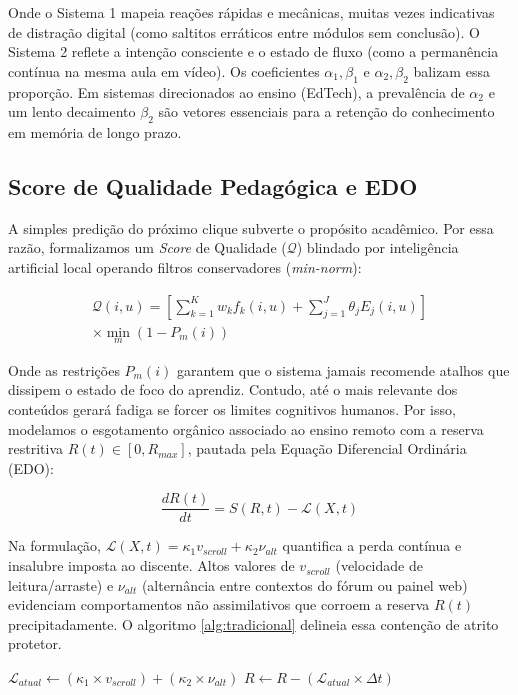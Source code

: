 \documentclass[english, spanish, brazilian]{RBIEarticle}
\begin{document}
Onde o Sistema 1 mapeia reações rápidas e mecânicas, muitas vezes indicativas de distração digital (como saltitos erráticos entre módulos sem conclusão). O Sistema 2 reflete a intenção consciente e o estado de fluxo (como a permanência contínua na mesma aula em vídeo). Os coeficientes $\alpha_1, \beta_1$ e $\alpha_2, \beta_2$ balizam essa proporção. Em sistemas direcionados ao ensino (EdTech), a prevalência de $\alpha_2$ e um lento decaimento $\beta_2$ são vetores essenciais para a retenção do conhecimento em memória de longo prazo.

\subsection{Score de Qualidade Pedagógica e EDO}

A simples predição do próximo clique subverte o propósito acadêmico. Por essa razão, formalizamos um \textit{Score} de Qualidade ($\mathcal{Q}$) blindado por inteligência artificial local operando filtros conservadores (\textit{min-norm}):

\begin{multline} \label{eq:score}
    \mathcal{Q}(i,u) = \left[ \sum_{k=1}^{K} w_k f_k(i,u) + \sum_{j=1}^{J} \theta_j E_j(i,u) \right] \\
    \times \min_{m} (1 - P_m(i))
\end{multline}

Onde as restrições $P_m(i)$ garantem que o sistema jamais recomende atalhos que dissipem o estado de foco do aprendiz. Contudo, até o mais relevante dos conteúdos gerará fadiga se forcer os limites cognitivos humanos. Por isso, modelamos o esgotamento orgânico associado ao ensino remoto com a reserva restritiva $R(t) \in [0, R_{max}]$, pautada pela Equação Diferencial Ordinária (EDO):

\begin{equation} \label{eq:edo}
    \frac{dR(t)}{dt} = S(R, t) - \mathcal{L}(X, t)
\end{equation}

Na formulação, $\mathcal{L}(X, t) = \kappa_1 v_{scroll} + \kappa_2 \nu_{alt}$ quantifica a perda contínua e insalubre imposta ao discente. Altos valores de $v_{scroll}$ (velocidade de leitura/arraste) e $\nu_{alt}$ (alternância entre contextos do fórum ou painel web) evidenciam comportamentos não assimilativos que corroem a reserva $R(t)$ precipitadamente. O algoritmo \ref{alg:tradicional} delineia essa contenção de atrito protetor.

\begin{algorithm}[h]
\caption{Proteção por \textit{Edge AI} na Interface do Aluno}
\label{alg:tradicional}
$\mathcal{L}_{atual} \gets (\kappa_1 \times v_{scroll}) + (\kappa_2 \times \nu_{alt})$\;
$R \gets R - (\mathcal{L}_{atual} \times \Delta t)$\;
\;
\end{algorithm}
\end{document}
